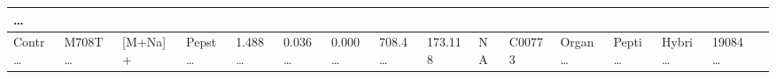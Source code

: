 \documentclass[
]{article}
\begin{document}
\begin{longtable}[]{@{}llllllllllllllll@{}}
\begin{minipage}[b]{0.02\columnwidth}
\ldots{}\strut
\end{minipage}\tabularnewline
\midrule
\endhead
\begin{minipage}[t]{0.04\columnwidth}\raggedright
Contr\ldots{}\strut
\end{minipage} & \begin{minipage}[t]{0.04\columnwidth}\raggedright
M708T\ldots{}\strut
\end{minipage} & \begin{minipage}[t]{0.04\columnwidth}\raggedright
{[}M+Na{]}+\strut
\end{minipage} & \begin{minipage}[t]{0.04\columnwidth}\raggedright
Pepst\ldots{}\strut
\end{minipage} & \begin{minipage}[t]{0.04\columnwidth}\raggedright
1.488\ldots{}\strut
\end{minipage} & \begin{minipage}[t]{0.04\columnwidth}\raggedright
0.036\ldots{}\strut
\end{minipage} & \begin{minipage}[t]{0.04\columnwidth}\raggedright
0.000\ldots{}\strut
\end{minipage} & \begin{minipage}[t]{0.04\columnwidth}\raggedright
708.4\ldots{}\strut
\end{minipage} & \begin{minipage}[t]{0.04\columnwidth}\raggedright
173.118\strut
\end{minipage} & \begin{minipage}[t]{0.04\columnwidth}\raggedright
NA\strut
\end{minipage} & \begin{minipage}[t]{0.03\columnwidth}\raggedright
C00773\strut
\end{minipage} & \begin{minipage}[t]{0.04\columnwidth}\raggedright
Organ\ldots{}\strut
\end{minipage} & \begin{minipage}[t]{0.04\columnwidth}\raggedright
Pepti\ldots{}\strut
\end{minipage} & \begin{minipage}[t]{0.04\columnwidth}\raggedright
Hybri\ldots{}\strut
\end{minipage} & \begin{minipage}[t]{0.04\columnwidth}\raggedright
19084\ldots{}\strut
\end{minipage} & \begin{minipage}[t]{0.02\columnwidth}\raggedright

\end{minipage}
\end{longtable}
\end{document}
